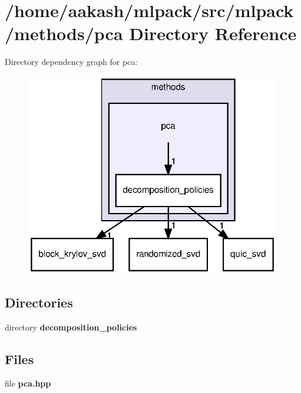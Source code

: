 \section{/home/aakash/mlpack/src/mlpack/methods/pca Directory Reference}
\label{dir_473b7c10a53e85be883d242699eb1a8c}
Directory dependency graph for pca\+:
\nopagebreak
\begin{figure}[H]
\begin{center}
\leavevmode
\includegraphics[width=316pt]{dir_473b7c10a53e85be883d242699eb1a8c_dep}
\end{center}
\end{figure}
\subsection*{Directories}
\begin{DoxyCompactItemize}
\item 
directory \textbf{ decomposition\+\_\+policies}
\end{DoxyCompactItemize}
\subsection*{Files}
\begin{DoxyCompactItemize}
\item 
file \textbf{ pca.\+hpp}
\end{DoxyCompactItemize}
